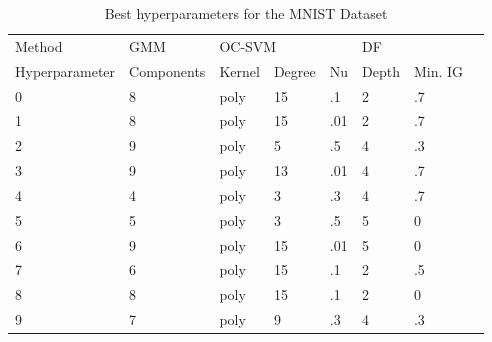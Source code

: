 \documentclass[10pt]{article}
\begin{document}
\begin{table}[H]
    \centering
    \begin{tabular}{@{}llllllll@{}}
    \toprule
    Method & \gls{GMM} & \multicolumn{3}{l}{OC-SVM} & \multicolumn{3}{l}{\acrlong{DF}} \\ 
    Hyperparameter & Components & Kernel & Degree & Nu & Depth & Min. \gls{IG} \\\midrule
    0 & 8 & poly & 15 & .1  & 2 & .7  \\
    1 & 8 & poly & 15 & .01 & 2 & .7  \\
    2 & 9 & poly & 5  & .5  & 4 & .3  \\
    3 & 9 & poly & 13 & .01 & 4 & .7  \\
    4 & 4 & poly & 3  & .3  & 4 & .7  \\
    5 & 5 & poly & 3  & .5  & 5 &  0  \\
    6 & 9 & poly & 15 & .01 & 5 &  0  \\
    7 & 6 & poly & 15 & .1  & 2 & .5  \\
    8 & 8 & poly & 15 & .1  & 2 & 0   \\
    9 & 7 & poly & 9  & .3  & 4 & .3  \\ \bottomrule
    \end{tabular}
    \caption{Best hyperparameters for the \gls{MNIST} Dataset}
    \label{table:hyperparameters-results-mnist}
\end{table}
\end{document}

